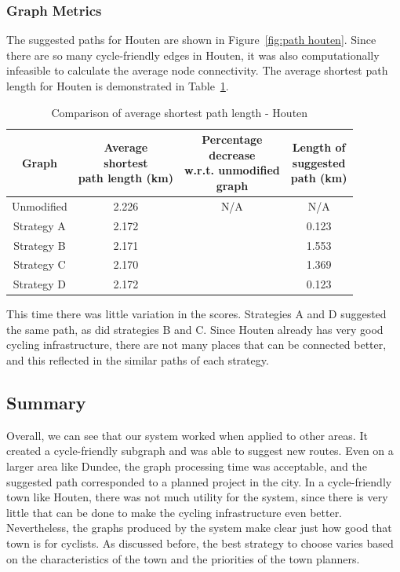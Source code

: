 \documentclass[12pt,a4paper]{report}
\begin{document}
\subsubsection*{Graph Metrics}
The suggested paths for Houten are shown in Figure~\ref{fig:path houten}. Since there are so many cycle-friendly edges in Houten, it was also computationally infeasible to calculate the average node connectivity. The average shortest path length for Houten is demonstrated in Table~\ref{tab:avg houten}.

\begin{table}[ht!]
    \centering
    \begin{tabular}{|c|c|c|c|}
        \hline
        Graph & \makecell{Average \\shortest \\path length (km)} & \makecell{Percentage \\decrease \\w.r.t. unmodified \\graph} & \makecell{Length of \\suggested \\path (km)}\\
        \hline
        Unmodified & 2.226 & N/A & N/A\\
        Strategy A & 2.172 &  & 0.123\\
        Strategy B & 2.171 &  & 1.553\\
        Strategy C & 2.170 &  & 1.369\\
        Strategy D & 2.172 &  & 0.123\\
        \hline
    \end{tabular}
    \caption{Comparison of average shortest path length - Houten}
    \label{tab:avg houten}
\end{table}

This time there was little variation in the scores. Strategies A and D suggested the same path, as did strategies B and C. Since Houten already has very good cycling infrastructure, there are not many places that can be connected better, and this reflected in the similar paths of each strategy.

\subsection{Summary}
Overall, we can see that our system worked when applied to other areas. It created a cycle-friendly subgraph and was able to suggest new routes. Even on a larger area like Dundee, the graph processing time was acceptable, and the suggested path corresponded to a planned project in the city. In a cycle-friendly town like Houten, there was not much utility for the system, since there is very little that can be done to make the cycling infrastructure even better. Nevertheless, the graphs produced by the system make clear just how good that town is for cyclists. As discussed before, the best strategy to choose varies based on the characteristics of the town and the priorities of the town planners.
\end{document}
